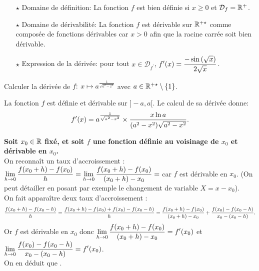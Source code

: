 \documentclass[a4paper, 11pt,reqno]{article}
\begin{document}
\begin{correction}
\begin{enumerate}
\begin{itemize}
			      \item[$\star$] Domaine de d\'efinition: La fonction $f$ est bien d\'efinie si $x\geq 0$ et $\mathcal{D}_f=\mathbb{R}^+$.
			      \item[$\star$] Domaine de d\'erivabilit\'e: La fonction $f$ est d\'erivable sur $\mathbb{R}^{+\star}$ comme compos\'ee de fonctions d\'erivables car $x>0$ afin que la racine carr\'ee soit bien d\'erivable.
			      \item[$\star$] Expression de la d\'eriv\'ee: pour tout $x\in\mathcal{D}_{f^{\prime}}$, $f^{\prime}(x)=\displaystyle\frac{-\sin{(\sqrt{x})}}{2\sqrt{x}}$.
		      \end{itemize}
	\end{enumerate}
\end{correction}



\begin{exercice}   \;
	Calculer la d\'eriv\'ee de $f:\ x\mapsto a^{\frac{1}{\sqrt{a^2-x^2}}}$ avec $a\in\mathbb{R}^{+\star}\setminus\lbrace 1\rbrace$.
\end{exercice}
\begin{correction}  \;
	La fonction $f$ est d\'efinie et d\'erivable sur $\rbrack -a,a\lbrack$. Le calcul de sa d\'eriv\'ee donne:
	$$f^{\prime}(x)=a^{\frac{1}{\sqrt{a^2-x^2}}}\times\displaystyle\frac{x\ln{a}}{(a^2-x^2)\sqrt{a^2-x^2}}.$$
\end{correction}

\begin{correction}   \;
	\textbf{Soit $x_0\in \mathbb{R}$ fix\'e, et soit $f$ une fonction d\'efinie au voisinage de $x_0$ et d\'erivable en $x_0$.}\vsec\\
	On reconna\^it un taux d'accroissement : $\displaystyle\lim\limits_{h \to 0} \frac{f(x_0+h) - f(x_0)}{h} = \lim\limits_{h \to 0} \frac{f(x_0+h) - f(x_0)}{(x_0+h)-x_0} =$  car $f$ est d\'erivable en $x_0$. (On peut d\'etailler en posant par exemple le changement de variable $X=x-x_0$).\\
	On fait appara\^itre deux taux d'accroissement :
	$$\displaystyle \frac{f(x_0+h) - f(x_0-h)}{h} = \frac{f(x_0+h) -f(x_0)+f(x_0)-f(x_0-h)}{h} =  \frac{f(x_0+h) -f(x_0)}{(x_0+h)-x_0}+ \frac{f(x_0)-f(x_0-h)}{x_0-(x_0-h)}.$$
	Or $f$ est d\'erivable en $x_0$ donc $\displaystyle\lim\limits_{h \to 0} \frac{f(x_0+h) -f(x_0)}{(x_0+h)-x_0} = f'(x_0)$ et $\displaystyle\lim\limits_{h \to 0} \frac{f(x_0)-f(x_0-h)}{x_0-(x_0-h)} = f'(x_0)$.\\
	On en d\'eduit que .
\end{correction}
\end{document}
